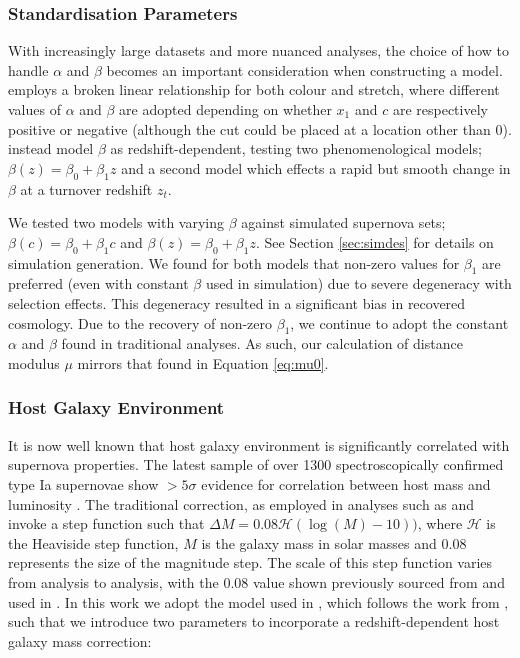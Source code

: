 \documentclass[a4paper,fleqn,usenatbib]{mnras}
\newcommand{\rubin}{\citetalias{Rubin2015}}
\begin{document}
\subsubsection{Standardisation Parameters}

With increasingly large datasets and more nuanced analyses, the choice of how to handle $\alpha$ and $\beta$ becomes an important consideration when constructing a model. {\rubin} employs a broken linear relationship for both colour and stretch, where different values of $\alpha$ and $\beta$ are adopted depending on whether $x_1$ and $c$ are respectively positive or negative (although the cut could be placed at a location other than 0). \citet{Shariff2016} instead model $\beta$ as redshift-dependent, testing two phenomenological models; $\beta(z) = \beta_0 + \beta_1 z$ and a second model which effects a rapid but smooth change in $\beta$ at a turnover redshift $z_t$.

We tested two models with varying $\beta$ against simulated supernova sets; $\beta(c) = \beta_0 + \beta_1 c$ and $\beta(z) = \beta_0 + \beta_1 z$. See Section \ref{sec:simdes} for details on simulation generation. We found for both models that non-zero values for $\beta_1$ are preferred (even with constant $\beta$ used in simulation) due to severe degeneracy with selection effects. This degeneracy resulted in a significant bias in recovered cosmology. Due to the recovery of non-zero $\beta_1$, we continue to adopt the constant $\alpha$ and $\beta$ found in traditional analyses. As such, our calculation of distance modulus $\mu$ mirrors that found in Equation \eqref{eq:mu0}.

\subsubsection{Host Galaxy Environment}

It is now well known that host galaxy environment is significantly correlated with supernova properties. The latest sample of over 1300 spectroscopically confirmed type Ia supernovae show $>5\sigma$ evidence for correlation between host mass and luminosity \citep{Uddin2017}. The traditional correction, as employed in analyses such as \citet{Suzuki2012} and \citet{Betoule2014} invoke a step function such that $\Delta M = 0.08 \mathcal{H}(\log(M) - 10))$, where $\mathcal{H}$ is the Heaviside step function, $M$ is the galaxy mass in solar masses and $0.08$ represents the size of the magnitude step. The scale of this step function varies from analysis to analysis, with the 0.08 value shown previously sourced from \cite{Sullivan2010} and used in \citet{Betoule2014}. In this work we adopt the model used in {\rubin}, which follows the work from \citet{Rigault2013}, such that we introduce two parameters to incorporate a redshift-dependent host galaxy mass correction:
\end{document}
